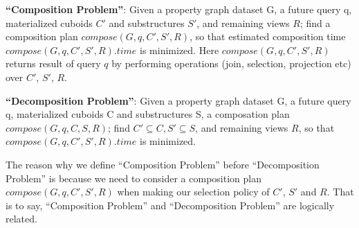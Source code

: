 \textbf{``Composition Problem''}:
Given a property graph dataset G, a future query q, materialized cuboids $C'$ and substructures $S'$, and remaining views $R$; find a composition plan $compose(G, q, C', S', R)$, so that estimated composition time $compose(G, q, C', S', R).time$ is minimized. Here $compose(G, q, C', S', R)$ returns result of query $q$ by performing operations (join, selection, projection etc) over $C'$, $S'$, $R$.


\textbf{``Decomposition Problem''}:
Given a property graph dataset G, a future query q, materialized cuboids C and substructures S, a composation plan $compose(G, q, C, S, R)$; find $C' \subseteq C, S'\subseteq S$, and remaining views $R$, so that $compose(G, q, C', S', R).time$ is minimized. 
 
 The reason why we  define ``Composition Problem'' before ``Decomposition Problem'' is because we need to consider a composition plan $compose(G, q, C', S', R)$ when making our selection policy of $C'$, $S'$ and $R$. That is to say, ``Composition Problem'' and ``Decomposition Problem'' are logically related.  
